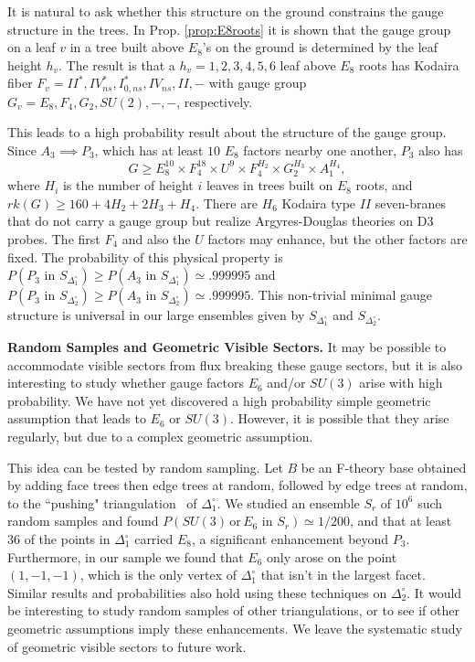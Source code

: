 \documentclass[aps,prl,twocolumn, superscriptaddress,groupedaddress,nofootinbib]{revtex4-1}
\newcommand{\sdoc}{S_{\Delta_1^\circ}}
\newcommand{\sdtc}{S_{\Delta_2^\circ}}
\newcommand{\doc}{{\Delta_1^\circ}}
\newcommand{\dtc}{{\Delta_2^\circ}}
\newcommand{\textin}{\,\, \text{in} \,\,}
\begin{document}
It is natural to ask whether this structure on the ground constrains the gauge
structure in the trees. In Prop. \ref{prop:E8roots} it is shown that the 
 gauge group on a leaf $v$ in a tree built above $E_8$'s on the ground
is determined by the leaf height $h_v$. 
The result is that a $h_v=1,2,3,4,5,6$ leaf
above $E_8$ roots has Kodaira fiber $F_v=II^*,IV^*_{ns},I^*_{0,ns},IV_{ns},II,-$
with gauge group $G_v=E_8,F_4,G_2,SU(2),-,-$, respectively.

This leads to a high probability result about the structure of the  gauge group.
Since $A_3\implies P_3$, which has at least $10$ $E_8$ factors nearby one another, $P_3$
also has
\begin{equation}
G\geq E_8^{10} \times F_4^{18}\times U^9 \times F_4^{H_2}\times G_2^{H_3}\times A_1^{H_4},
\end{equation}
where $H_i$ is the number of height $i$ leaves in trees built on $E_8$ roots,
and $rk(G)\geq 160+4H_2+2H_3+H_4$.
There are $H_6$ Kodaira type $II$ seven-branes that do not carry a gauge group but realize
Argyres-Douglas theories on D3 probes. The first $F_4$ and also
the $U$ factors may enhance, but the other factors are fixed. The probability
of this physical property is $P(P_3\textin \sdoc)\geq P(A_3\textin \sdoc) \simeq .999995$ and $P(P_3\textin \sdtc)\geq P(A_3\textin \sdtc) \simeq .999995$. This non-trivial minimal gauge structure is universal in our large ensembles given by $\sdoc$ and $\sdtc$.


\vspace{.2cm}
\noindent \textbf{Random Samples and Geometric Visible Sectors.} 
It may be possible to accommodate visible sectors from flux breaking
these gauge sectors, but it is also interesting to study whether gauge
factors $E_6$ and/or $SU(3)$ arise with high probability.
We have not yet discovered a high probability simple geometric assumption
that leads to $E_6$ or $SU(3)$. However, it is possible that they arise regularly,
but due to a complex geometric assumption.

This idea can be tested by random sampling. Let $B$ be an F-theory base obtained
by adding face trees then edge trees at random, followed by edge trees at random, to the ``pushing" 
triangulation~\cite{DeLoera:2010:TSA:1952022} of $\doc$. We studied an ensemble $S_r$ of $10^6$ such random samples 
and found $P(SU(3) \, \text{or} \, E_6 \textin S_r)\simeq 1/200$, and that at least 
$36$ of the points in $\doc$ carried $E_8$, a significant enhancement beyond
$P_3$.  Furthermore, in our sample we found that $E_6$ only
arose on the point $(1,-1,-1)$, which is the only vertex of $\doc$
that isn't in the largest facet.  Similar results and probabilities also hold
using these techniques on $\dtc$. It would be interesting to study random samples of other triangulations, or to
see if other geometric assumptions imply these enhancements. We 
leave the systematic study of geometric visible sectors to future work.
\end{document}
